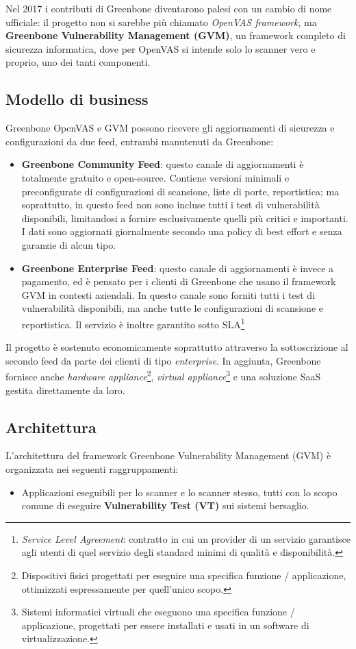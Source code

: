 Nel 2017 i contributi di Greenbone diventarono palesi con un cambio di nome ufficiale: il progetto non si sarebbe più chiamato \emph{OpenVAS framework}, ma \textbf{Greenbone Vulnerability Management (GVM)}, un framework completo di sicurezza informatica, dove per OpenVAS si intende solo lo scanner vero e proprio, uno dei tanti componenti.

\subsection{Modello di business}
Greenbone OpenVAS e GVM possono ricevere gli aggiornamenti di sicurezza e configurazioni da due feed, entrambi manutenuti da Greenbone:
\begin{itemize}
    \item \textbf{Greenbone Community Feed}: questo canale di aggiornamenti è totalmente gratuito e open-source. Contiene versioni minimali e preconfigurate di configurazioni di scansione, liste di porte, reportistica; ma soprattutto, in questo feed non sono incluse tutti i test di vulnerabilità disponibili, limitandosi a fornire esclusivamente quelli più critici e importanti. I dati sono aggiornati giornalmente secondo una policy di best effort e senza garanzie di alcun tipo.
    \item \textbf{Greenbone Enterprise Feed}: questo canale di aggiornamenti è invece a pagamento, ed è pensato per i clienti di Greenbone che usano il framework GVM in contesti aziendali. In questo canale sono forniti tutti i test di vulnerabilità disponibili, ma anche tutte le configurazioni di scansione e reportistica. Il servizio è inoltre garantito sotto SLA\footnote{\emph{Service Level Agreement}: contratto in cui un provider di un servizio garantisce agli utenti di quel servizio degli standard minimi di qualità e disponibilità.}
\end{itemize}
Il progetto è sostenuto economicamente soprattutto attraverso la sottoscrizione al secondo feed da parte dei clienti di tipo \emph{enterprise}. In aggiunta, Greenbone fornisce anche \emph{hardware appliance}\footnote{Dispositivi fisici progettati per eseguire una specifica funzione / applicazione, ottimizzati espressamente per quell'unico scopo.}, \emph{virtual appliance}\footnote{Sistemi informatici virtuali che eseguono una specifica funzione / applicazione, progettati per essere installati e usati in un software di virtualizzazione.} e una soluzione SaaS gestita direttamente da loro.

\subsection{Architettura}
L'architettura del framework Greenbone Vulnerability Management (GVM) è organizzata nei seguenti raggruppamenti:
\begin{itemize}
    \item Applicazioni eseguibili per lo scanner e lo scanner stesso, tutti con lo scopo comune di eseguire \textbf{Vulnerability Test (VT)} sui sistemi bersaglio.
\end{itemize}

